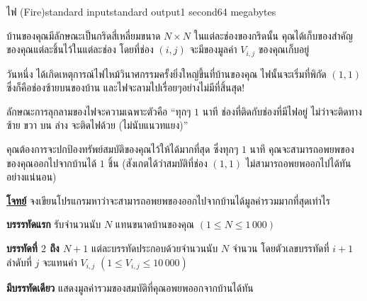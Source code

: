 \documentclass[11pt,a4paper]{article}
\begin{document}
\begin{problem}{ไฟ (Fire)}{standard input}{standard output}{1 second}{64 megabytes}

 บ้านของคุณมีลักษณะเป็นกริดสี่เหลี่ยมขนาด $N \times N$ ในแต่ละช่องของกริดนั้น คุณได้เก็บของสำคัญของคุณแต่ละชิ้นไว้ในแต่ละช่อง โดยที่ช่อง $(i,j)$ จะมีของมูลค่า $V_{i,j}$ ของคุณเก็บอยู่

                วันหนึ่ง ได้เกิดเหตุการณ์ไฟไหม้วินาศกรรมครั้งยิ่งใหญ่ขึ้นที่บ้านของคุณ ไฟนั้นจะเริ่มที่พิกัด $(1,1)$ ซึ่งก็คือช่องซ้ายบนของบ้าน และไฟจะลามไปเรื่อยๆอย่างไม่มีที่สิ้นสุด!

                ลักษณะการลุกลามของไฟจะความเฉพาะตัวคือ “ทุกๆ $1$ นาที ช่องที่ติดกับช่องที่มีไฟอยู่ ไม่ว่าจะติดทางซ้าย ขวา บน ล่าง จะติดไฟด้วย (ไม่นับแนวทแยง)”

                คุณต้องการจะปกป้องทรัพย์สมบัติของคุณไว้ให้ได้มากที่สุด ซึ่งทุกๆ $1$ นาที คุณจะสามารถอพยพของของคุณออกไปจากบ้านได้ $1$ ชิ้น (สังเกตได้ว่าสมบัติที่ช่อง $(1,1)$ ไม่สามารถอพยพออกไปได้ทันอย่างแน่นอน)


\bigskip
\underline{\textbf{โจทย์}}  จงเขียนโปรแกรมหาว่าจะสามารถอพยพของออกไปจากบ้านได้มูลค่ารวมมากที่สุดเท่าไร


\InputFile

\textbf{บรรรทัดแรก} รับจำนวนนับ $N$ แทนขนาดบ้านของคุณ $( 1 \leq N \leq 1\,000 )$

\textbf{บรรทัดที่ $2$ ถึง $N+1$} แต่ละบรรทัดประกอบด้วยจำนวนนับ $N$ จำนวน โดยตัวเลขบรรทัดที่ $i+1$ ลำดับที่ $j$ จะแทนค่า $V_{i,j}$ $( 1 \leq V_{i,j} \leq 10\,000 )$


\OutputFile

\textbf{มีบรรทัดเดียว} แสดงมูลค่ารวมของสมบัติที่คุณอพยพออกจากบ้านได้ทัน

\Examples

\begin{example}
%
%
\end{example}


\end{problem}
\end{document}
